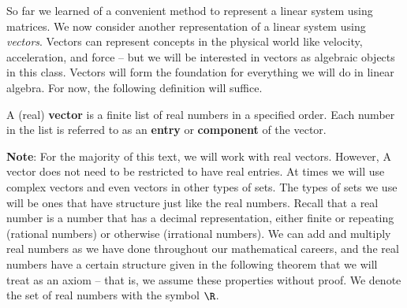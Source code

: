 
So far we learned of a convenient method to represent a linear system using matrices. We now consider another representation of a linear system using \emph{vectors}. Vectors can represent concepts in the physical world like velocity, acceleration, and force -- but we will be interested in vectors as algebraic objects in this class. Vectors will form the foundation for everything we will do in linear algebra. For now, the following definition will suffice.

\begin{definition} A (real) \textbf{vector} is a finite list of real numbers in a specified order. Each number in the list is referred to as an \textbf{entry} or \textbf{component} of the vector.
\end{definition}

\noindent \textbf{Note}: For the majority of this text, we will work with real vectors. However, A vector does not need to be restricted to have real entries. At times we will use complex vectors and even vectors in other types of sets. The types of sets we use will be ones that have structure just like the real numbers. Recall that a real number is a number that has a decimal representation, either finite or repeating (rational numbers) or otherwise (irrational numbers). We can add and multiply real numbers as we have done throughout our mathematical careers, and the real numbers have a certain structure given in the following theorem that we will treat as an axiom -- that is, we assume these properties without proof. We denote the set of real numbers with the symbol $\R$. 

